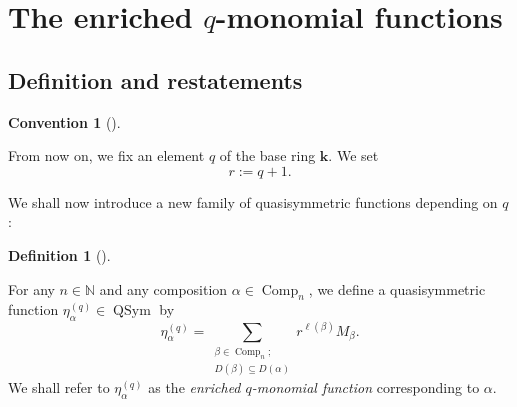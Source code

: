 \documentclass[numbers=enddot,12pt,final,onecolumn,notitlepage]{scrartcl}%
\theoremstyle{definition}
\newtheorem{defi}[theo]{Definition}
\newenvironment{definition}[1][]
{\begin{defi}[#1]\begin{leftbar}}
{\end{leftbar}\end{defi}}
\newtheorem{conv}[theo]{Convention}
\newenvironment{convention}[1][]
{\begin{conv}[#1]\begin{leftbar}}
{\end{leftbar}\end{conv}}
\let\sumnonlimits\sum
\renewcommand{\sum}{\sumnonlimits\limits}
\begin{document}
\section{\label{sec.eta}The enriched $q$-monomial functions}

\subsection{Definition and restatements}

\begin{convention}
\label{conv.q-r}From now on, we fix an element $q$ of the base ring
$\mathbf{k}$. We set%
\[
r:=q+1.
\]

\end{convention}

We shall now introduce a new family of quasisymmetric functions depending on
$q$:

\begin{definition}
\label{def.etaalpha}For any $n\in\mathbb{N}$ and any composition $\alpha
\in\operatorname*{Comp}\nolimits_{n}$, we define a quasisymmetric function
$\eta_{\alpha}^{\left(  q\right)  }\in\operatorname*{QSym}$ by%
\begin{equation}
\eta_{\alpha}^{\left(  q\right)  }=\sum_{\substack{\beta\in
\operatorname*{Comp}\nolimits_{n};\\D\left(  \beta\right)  \subseteq D\left(
\alpha\right)  }}r^{\ell\left(  \beta\right)  }M_{\beta}.
\label{eq.def.etaalpha.def}%
\end{equation}
We shall refer to $\eta_{\alpha}^{\left(  q\right)  }$ as the \emph{enriched
$q$-monomial function} corresponding to $\alpha$.
\end{definition}
\end{document}
